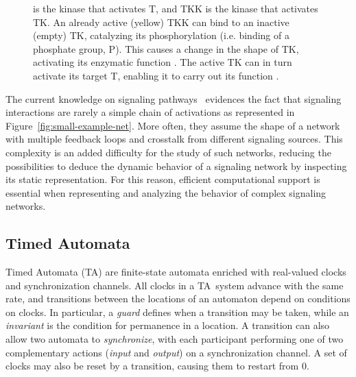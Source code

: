 \documentclass{llncs}
\newcommand{\ta}{Timed Automaton}
\newcommand{\tas}{Timed Automata}
\begin{document}
\begin{figure}[htbp]
{is the kinase that activates {\sf T}, and {\sf TKK} is the kinase that activates {\sf TK}.
{\bf\protect{}} An already active (yellow) {\sf TKK} can bind to
an inactive (empty) {\sf TK}, catalyzing its phosphorylation (i.e. binding of a phosphate group, {\sf P}).
This causes a change in the shape of {\sf TK}, activating its enzymatic function {\bf\protect{}}.
The active {\sf TK} can in turn activate its target {\sf T}, enabling it to carry out its function {\bf\protect{}}.
}\label{fig:small-example-biology}
\end{figure}


The current knowledge on signaling pathways~\cite{kegg,phosphosite} evidences the fact
that signaling interactions are rarely a simple chain of activations as represented in Figure~\ref{fig:small-example-net}.
More often, they assume the shape of a network with multiple feedback loops and crosstalk from different signaling sources.
This complexity is an added difficulty for the study of such networks, reducing the possibilities
to deduce the dynamic behavior of a signaling network by inspecting its static representation.
For this reason, efficient computational support is essential when representing and analyzing the behavior
of complex signaling networks.


\subsection{\tas}\label{sec:TA}
\renewcommand{\ta}{TA}
\renewcommand{\tas}{TA}
Timed Automata (\tas) are finite-state automata enriched with real-valued clocks
and synchronization channels. All clocks in a \tas\ system advance with the same rate,
and transitions between the locations of an automaton
depend on conditions on clocks. In particular, a \emph{guard} defines when a transition
may be taken, while an \emph{invariant} is the condition for permanence in a location.
A transition can also allow two automata to \emph{synchronize},
with each participant performing one of two complementary actions (\emph{input} and \emph{output})
on a synchronization channel. A set of clocks may also be reset by a transition, causing them to restart from 0.
\end{document}
